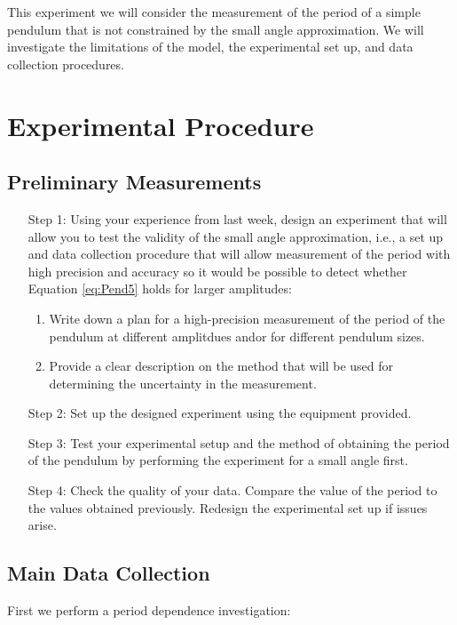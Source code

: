 \documentclass[12pt, a4paper, oneside, openright, titlepage]{book}
\begin{document}
This experiment we will consider the measurement of the period of a simple pendulum that is not constrained by the small angle approximation. We will investigate the limitations of the model, the experimental set up, and data collection procedures.


\section{Experimental Procedure}

\subsection{Preliminary Measurements}

\begin{itemize}[leftmargin = 50pt]
    \item[Step 1:] Using your experience from last week, design an experiment that will allow you to test the validity of the small angle approximation, i.e., a set up and data collection procedure that will allow measurement of the period with high precision and accuracy so it would be possible to detect whether Equation \ref{eq:Pend5} holds for larger amplitudes: \begin{enumerate}
            \item Write down a plan for a high-precision measurement of the period of the pendulum at different amplitdues andor for different pendulum sizes.
            \item Provide a clear description on the method that will be used for determining the uncertainty in the measurement.
    \end{enumerate}
    \item[Step 2:] Set up the designed experiment using the equipment provided.
    \item[Step 3:] Test your experimental setup and the method of obtaining the period of the pendulum by performing the experiment for a small angle first.
    \item[Step 4:] Check the quality of your data. Compare the value of the period to the values obtained previously. Redesign the experimental set up if issues arise.
\end{itemize}

\subsection{Main Data Collection}

First we perform a period dependence investigation:
\end{document}
